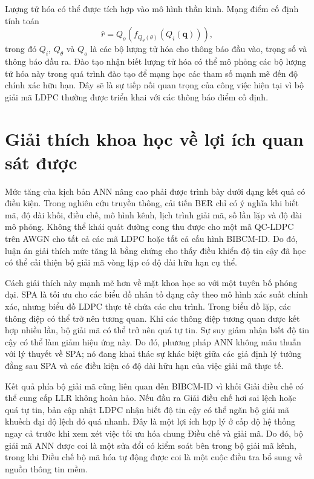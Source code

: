 Lượng tử hóa có thể được tích hợp vào mô hình thần kinh. Mạng điểm cố định tính toán
\begin{equation}
  \hat{r}=Q_o\left(f_{Q_\theta(\theta)}(Q_i(\mathbf{q}))\right),
\end{equation}
trong đó $Q_i$, $Q_\theta$ và $Q_o$ là các bộ lượng tử hóa cho thông báo đầu vào, trọng số và thông báo đầu ra. Đào tạo nhận biết lượng tử hóa có thể mô phỏng các bộ lượng tử hóa này trong quá trình đào tạo để mạng học các tham số mạnh mẽ đến độ chính xác hữu hạn. Đây sẽ là sự tiếp nối quan trọng của công việc hiện tại vì bộ giải mã LDPC thường được triển khai với các thông báo điểm cố định.

\section{Giải thích khoa học về lợi ích quan sát được}
Mức tăng của kịch bản ANN nâng cao phải được trình bày dưới dạng kết quả có điều kiện. Trong nghiên cứu truyền thông, cải tiến BER chỉ có ý nghĩa khi biết mã, độ dài khối, điều chế, mô hình kênh, lịch trình giải mã, số lần lặp và độ dài mô phỏng. Không thể khái quát đường cong thu được cho một mã QC-LDPC trên AWGN cho tất cả các mã LDPC hoặc tất cả cấu hình BIBCM-ID. Do đó, luận án giải thích mức tăng là bằng chứng cho thấy điều khiển độ tin cậy đã học có thể cải thiện bộ giải mã vòng lặp có độ dài hữu hạn cụ thể.

Cách giải thích này mạnh mẽ hơn về mặt khoa học so với một tuyên bố phóng đại. SPA là tối ưu cho các biểu đồ nhân tố dạng cây theo mô hình xác suất chính xác, nhưng biểu đồ LDPC thực tế chứa các chu trình. Trong biểu đồ lặp, các thông điệp có thể trở nên tương quan. Khi các thông điệp tương quan được kết hợp nhiều lần, bộ giải mã có thể trở nên quá tự tin. Sự suy giảm nhận biết độ tin cậy có thể làm giảm hiệu ứng này. Do đó, phương pháp ANN không mâu thuẫn với lý thuyết về SPA; nó đang khai thác sự khác biệt giữa các giả định lý tưởng đằng sau SPA và các điều kiện có độ dài hữu hạn của việc giải mã thực tế.

Kết quả phía bộ giải mã cũng liên quan đến BIBCM-ID vì khối Giải điều chế có thể cung cấp LLR không hoàn hảo. Nếu đầu ra Giải điều chế hơi sai lệch hoặc quá tự tin, bản cập nhật LDPC nhận biết độ tin cậy có thể ngăn bộ giải mã khuếch đại độ lệch đó quá nhanh. Đây là một lợi ích hợp lý ở cấp độ hệ thống ngay cả trước khi xem xét việc tối ưu hóa chung Điều chế và giải mã. Do đó, bộ giải mã ANN được coi là một sửa đổi có kiểm soát bên trong bộ giải mã kênh, trong khi Điều chế bộ mã hóa tự động được coi là một cuộc điều tra bổ sung về nguồn thông tin mềm.


